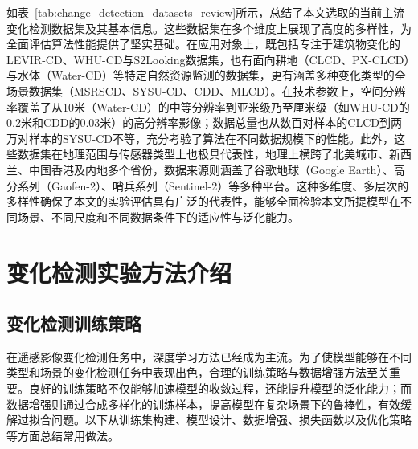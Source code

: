 如表~\ref{tab:change_detection_datasets_review}所示，总结了本文选取的当前主流变化检测数据集及其基本信息。这些数据集在多个维度上展现了高度的多样性，为全面评估算法性能提供了坚实基础。在应用对象上，既包括专注于建筑物变化的LEVIR-CD、WHU-CD与S2Looking数据集，也有面向耕地（CLCD、PX-CLCD）与水体（Water-CD）等特定自然资源监测的数据集，更有涵盖多种变化类型的全场景数据集（MSRSCD、SYSU-CD、CDD、MLCD）。在技术参数上，空间分辨率覆盖了从10米（Water-CD）的中等分辨率到亚米级乃至厘米级（如WHU-CD的0.2米和CDD的0.03米）的高分辨率影像；数据总量也从数百对样本的CLCD到两万对样本的SYSU-CD不等，充分考验了算法在不同数据规模下的性能。此外，这些数据集在地理范围与传感器类型上也极具代表性，地理上横跨了北美城市、新西兰、中国香港及内地多个省份，数据来源则涵盖了谷歌地球（Google Earth）、高分系列（Gaofen-2）、哨兵系列（Sentinel-2）等多种平台。这种多维度、多层次的多样性确保了本文的实验评估具有广泛的代表性，能够全面检验本文所提模型在不同场景、不同尺度和不同数据条件下的适应性与泛化能力。

\section{变化检测实验方法介绍}
\subsection{变化检测训练策略}
在遥感影像变化检测任务中，深度学习方法已经成为主流。为了使模型能够在不同类型和场景的变化检测任务中表现出色，合理的训练策略与数据增强方法至关重要。良好的训练策略不仅能够加速模型的收敛过程，还能提升模型的泛化能力；而数据增强则通过合成多样化的训练样本，提高模型在复杂场景下的鲁棒性，有效缓解过拟合问题。以下从训练集构建、模型设计、数据增强、损失函数以及优化策略等方面总结常用做法。

